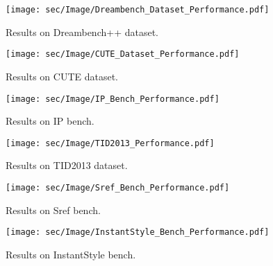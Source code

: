 \begin{figure}[htp]
    \centering
    \texttt{[image: sec/Image/Dreambench\_Dataset\_Performance.pdf]}
    \caption{Results on Dreambench++ dataset.}
    \label{bench}
\end{figure}

\begin{figure}[htp]
    \centering
    \texttt{[image: sec/Image/CUTE\_Dataset\_Performance.pdf]}
    \caption{Results on CUTE dataset.}
    \label{bench}
\end{figure}

\begin{figure}[htp]
    \centering
    \texttt{[image: sec/Image/IP\_Bench\_Performance.pdf]}
    \caption{Results on IP bench.}
    \label{bench}
\end{figure}

\begin{figure}[htp]
    \centering
    \texttt{[image: sec/Image/TID2013\_Performance.pdf]}
    \caption{Results on TID2013 dataset.}
    \label{bench}
\end{figure}

\begin{figure}[htp]
    \centering
    \texttt{[image: sec/Image/Sref\_Bench\_Performance.pdf]}
    \caption{Results on Sref bench.}
    \label{bench}
\end{figure}

\begin{figure}[htp]
    \centering
    \texttt{[image: sec/Image/InstantStyle\_Bench\_Performance.pdf]}
    \caption{Results on InstantStyle bench.}
    \label{instantstylebench}
\end{figure}

